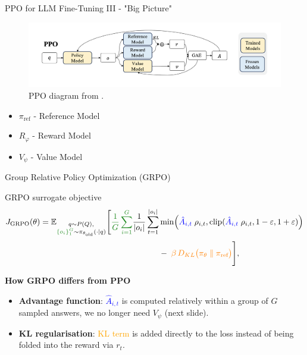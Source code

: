 \documentclass[9pt]{beamer}
\begin{document}
\begin{frame}{PPO for LLM Fine-Tuning III - "Big Picture"}
  \begin{figure}
    \centering
    \includegraphics[width=1.0\textwidth]{figures/ppo_big.png}
    \caption{PPO diagram from \cite{shao2024deepseekmathpushinglimitsmathematical}.}
    \label{fig:trl1}
  \end{figure}

  \begin{itemize}
    \item $\pi_{\text{ref}}$ - Reference Model
    \item $R_\varphi$ - Reward Model
    \item $V_\psi$ - Value Model
  \end{itemize}
\end{frame}

\begin{frame}{Group Relative Policy Optimization (GRPO)}
  \begin{block}{GRPO surrogate objective}
\begin{equation}
\begin{aligned}
J_{\text{GRPO}}(\theta)=
\mathbb{E}_{\substack{q\sim P(Q),\\
            \textcolor{ForestGreen}{\{o_i\}_{1}^{G}}\sim\pi_{\theta_{\text{old}}}(\cdot|q)}}\Biggl[
\textcolor{ForestGreen}{\frac{1}{G}\sum_{i=1}^{G}}
\frac{1}{|o_i|}\sum_{t=1}^{|o_i|}
&\min\Bigl(\textcolor{blue}{\hat{A}_{i,t}}\;\rho_{i,t},
            \mathrm{clip}(\textcolor{blue}{\hat{A}_{i,t}}\;\rho_{i,t},1-\varepsilon,1+\varepsilon)\Bigr)
\\[0.3em]
&-\;\textcolor{orange}{\beta\,D_{KL}\bigl(\pi_\theta\;\Vert\;\pi_{\text{ref}}\bigr)}
\Biggr],
\label{eq:grpo_obj}
\end{aligned}
\end{equation}
\end{block}

  \vspace{0.3em}

  \textbf{How GRPO differs from PPO}
  \pause
  \begin{itemize}\setlength\itemsep{0.25em}
    \item \textbf{Advantage function}: \textcolor{blue}{$\hat A_{i,t}$} is computed relatively within a
          group of \(G\) sampled answers, we no longer need $V_\psi$ (next slide).
    \pause
    \item \textbf{KL regularisation}: \textcolor{orange}{KL term} is added directly to the loss
          instead of being folded into the reward via \(r_t\).
  \end{itemize}
\end{frame}
\end{document}
